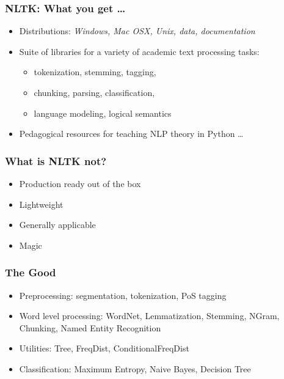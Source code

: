\begin{frame}[fragile]\frametitle{NLTK: What you get \ldots}
  \begin{itemize}
    \item Distributions:
      \textit{Windows, Mac OSX, Unix, data, documentation}
         \item  Suite of libraries for a variety of academic text processing tasks:
           \begin{itemize}
    \item tokenization, stemming, tagging,
    \item  chunking, parsing, classification,
    \item  language modeling, logical semantics
      \end{itemize}
    \item Pedagogical resources for teaching NLP theory in 
Python \ldots
  \end{itemize}
\end{frame}




\begin{frame}[fragile]\frametitle{What is NLTK not?}
  \begin{itemize}
    \item Production ready out of the box
    \item Lightweight
    \item Generally applicable
    \item Magic
  \end{itemize}
\end{frame}

\begin{frame}[fragile]\frametitle{The Good}
  \begin{itemize}
    \item Preprocessing: segmentation, tokenization, PoS tagging
    \item  Word level processing: WordNet, Lemmatization, Stemming, NGram, Chunking, Named Entity Recognition
    \item  Utilities: Tree, FreqDist, ConditionalFreqDist
    \item Classification: Maximum Entropy, Naive Bayes, Decision Tree
  \end{itemize}
\end{frame}


